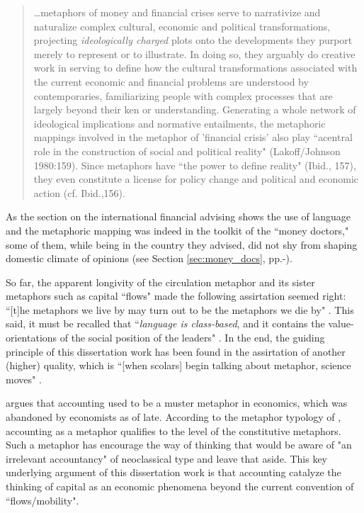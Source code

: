 \begin{quote}
\dots metaphors of money and financial crises serve to narrativize and naturalize complex cultural, economic and political transformations, projecting \textit{ideologically charged} plots onto the developments they purport merely to represent or to illustrate. In doing so, they arguably do creative work in serving to define how the cultural transformations associated with the current economic and financial problems are understood by contemporaries, familiarizing people with complex processes that are largely beyond their ken or understanding. Generating a whole network  of ideological implications and normative entailments, the metaphoric mappings involved in the metaphor of 'financial crisis' also play ``acentral role in the construction of social and political reality" (Lakoff/Johnson 1980:159). Since metaphors have ``the power to define reality" (Ibid., 157), they even constitute a license for policy change and political and economic action (cf. Ibid.,156). \citep[p.~63-64, emphasis added]{nunning2015}
\end{quote}

As the section on the international financial advising shows the use of language and the metaphoric mapping was indeed in the toolkit of the ``money doctors," some of them, while being in the country they advised, did not shy from shaping domestic climate of opinions (see Section \ref{sec:money_docs}, pp.\pageref{sec:money_docs}-\pageref{sec:mon_orthodoxy}).

So far, the apparent longivity of the circulation metaphor and its sister metaphors such as capital ``flows" made the following assirtation seemed right: ``[t]he metaphors we live by may turn out to be the metaphors we die by" \citep[p.~47]{walker2020}. This said, it must be recalled that ``\textit{language is class-based}, and it contains the value-orientations of the social position of the leaders" \citep[see][p.~ 375, review of \citep{brown1987}, emphasis original]{gilbert1989}. In the end, the guiding principle of this dissertation work has been found in the assirtation of another (higher) quality, which is ``[when scolars] begin talking about metaphor, science moves" \citep[p.~44]{klamer1994}. 

\cite{klamer1992} argues that accounting used to be a muster metaphor in economics, which was abandoned by economists as of late. According to the metaphor typology of \citeauthor{klamer1994}, accounting as a metaphor qualifies to the level of the constitutive metaphors. Such a metaphor has encourage the way of thinking that would be aware of "an irrelevant accountancy" \citep[p.~186]{keynes1933} of neoclassical type and leave that aside. This key underlying argument of this dissertation work is that accounting catalyze the thinking of capital as an economic phenomena beyond the current convention of ``flows/mobility".

